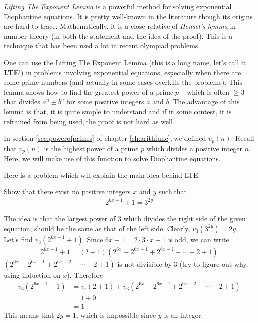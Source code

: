 \documentclass[main.tex]{subfile}
\begin{document}
\textit{Lifting The Exponent Lemma} is a powerful method for solving exponential Diophantine equations. It is pretty well-known in the literature though its origins are hard to trace. Mathematically, it is a close relative of \textit{Hensel's lemma} in number theory (in both the statement and the idea of the proof). This is a technique that has been used a lot in recent olympiad problems.

One can use the Lifting The Exponent Lemma (this is a long name, let's call it \textbf{LTE}!) in problems involving exponential equations, especially when there are some prime numbers (and actually in some cases overkills the problems). This lemma shows how to find the greatest power of a prime $p$ -- which is often $\geq 3$ -- that divides $a^n \pm b^n$ for some positive integers $a$ and $b$. The advantage of this lemma is that, it is quite simple to understand and if in some contest, it is refrained from being used, the proof is not hard as well.


In section \eqref{sec:powerofprimes} of chapter \eqref{ch:arithfunc}, we defined $v_p(n)$. Recall that $v_p(n)$ is the highest power of a prime $p$ which divides a positive integer $n$. Here, we will make use of this function to solve Diophantine equations.

Here is a problem which will explain the main idea behind LTE.

    \begin{problem}
    	Show that there exist no positive integers $x$ and $y$ such that
    	\begin{align*}
    		2^{6x+1} + 1 = 3^{2y}
    	\end{align*}
    \end{problem}

    \begin{solution}
    	The idea is that the largest power of $3$ which divides the right side of the given equation, should be the same as that of the left side. Clearly, $v_3(3^{2y})=2y$. Let's find $v_3\left(2^{6x+1} + 1\right)$. Since $6x+1= 2 \cdot 3 \cdot x +1$ is odd, we can write
    	\begin{align*}
    		2^{6x+1} + 1 = \left(2+1\right) \left(2^{6x} - 2^{6x-1} + 2^{6x-2} - \cdots - 2 + 1\right)
    	\end{align*}
    	$\left(2^{6x} - 2^{6x-1} + 2^{6x-2} - \cdots - 2 + 1\right)$ is not divisible by $3$ (try to figure out why, using induction on $x$). Therefore
    	\begin{align*}
    		v_3\left(2^{6x+1} + 1\right) &= v_3\left(2+1\right) + v_3\left(2^{6x} - 2^{6x-1} + 2^{6x-2} - \cdots - 2 + 1\right)\\
    		& = 1 + 0\\
    		& = 1
    	\end{align*}
    	This means that $2y=1$, which is impossible since $y$ is an integer.
    \end{solution}
\end{document}
